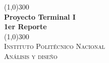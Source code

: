 \documentclass{article}
\begin{document}
\begin{titlepage}
	\begin{center}
	\line(1,0){300} \\
	[0.25in]
	\huge{\bfseries Proyecto Terminal I\\1er Reporte} \\
	[0.25in]
	\line(1,0){300} \\
	[1.5cm]
	\textsc{\LARGE Instituto Polit\'{e}cnico Nacional}\\
	[0.75cm]
	\textsc{\Large An\'{a}lisis y dise\~{n}o}\\
	
	\end{center}
\end{titlepage}
\end{document}
